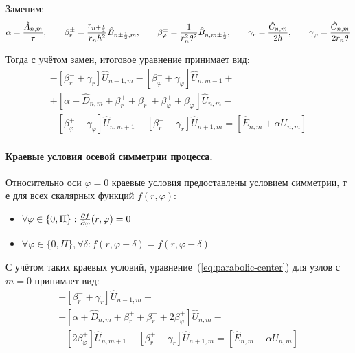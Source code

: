 Заменим:
\begin{equation*}
    \alpha = \frac{\hat{A}_{n,m}}{\tau}
    ,\qquad
    \beta_r^\pm = \frac{r_{n\pm\frac{1}{2}}}{r_n h^2}\hat{B}_{n\pm\frac{1}{2}, m}
    ,\qquad
    \beta_\varphi^\pm = \frac{1}{r_n^2 \theta^2}\hat{B}_{n, m\pm\frac{1}{2}}
    ,\qquad
    \gamma_r = \frac{\hat{C}_{n,m}}{2h}
    ,\qquad
    \gamma_\varphi = \frac{\hat{C}_{n,m}}{2r_n \theta}
\end{equation*}

Тогда с учётом замен, итоговое уравнение принимает вид:
\begin{gather}
    -\left[\beta_r^- + \gamma_r\right] \hat{U}_{n-1,m}
    -\left[\beta_\varphi^- + \gamma_\varphi\right] \hat{U}_{n,m-1}
    +\nonumber\\+
    \left[\alpha + \hat{D}_{n,m} + \beta_r^+ + \beta_r^- + \beta_\varphi^+ + 
    \beta_\varphi^-\right] \hat{U}_{n,m}
    -\nonumber\\
    -\left[\beta_\varphi^+ - \gamma_\varphi\right] \hat{U}_{n,m+1}
    -\left[\beta_r^+ - \gamma_r\right] \hat{U}_{n+1,m}
    =\left[\hat{E}_{n,m} + \alpha U_{n,m}\right]
    \label{eq:parabolic-center}
\end{gather}

\paragraph{Краевые условия осевой симметрии процесса.}
Относительно оси $\varphi=0$ краевые условия предоставлены условием симметрии, 
т е для всех скалярных функций $f(r,\varphi)$:
\begin{itemize}
    \item $\forall \varphi \in \{0, \Pi\}: \frac{\partial f}{\partial \varphi} 
    (r, \varphi) = 0$
    \item $\forall \varphi \in \{0, \Pi\}, \forall \delta: f(r, \varphi + 
    \delta) = f(r, \varphi - \delta)$
\end{itemize}

С учётом таких краевых условий, уравнение~(\ref{eq:parabolic-center}) для узлов 
с $m = 0$ принимает вид:
\begin{gather}
-\left[\beta_r^- + \gamma_r\right] \hat{U}_{n-1,m}
+\nonumber\\+
\left[\alpha + \hat{D}_{n,m} + \beta_r^+ + \beta_r^- + 2\beta_\varphi^+\right] 
\hat{U}_{n,m}
-\nonumber\\
-\left[2\beta_\varphi^+\right] \hat{U}_{n,m+1}
-\left[\beta_r^+ - \gamma_r\right] \hat{U}_{n+1,m}
=\left[\hat{E}_{n,m} + \alpha U_{n,m}\right]
\label{eq:parabolic-left}
\end{gather}

